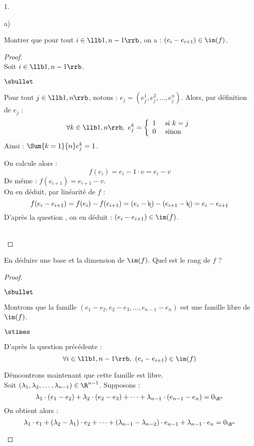 \documentclass[11pt]{article}%
\begin{document}
\begin{noliste}{1.}
\begin{noliste}{a)}
\newpage


\item Montrer que pour tout $i \in \llb 1,n-1 \rrb$, on a :
  $(e_i-e_{i+1})\in \im(f)$.
  
  \begin{proof}~\\
   Soit $i\in \llb 1, n-1 \rrb$.
   \begin{noliste}{$\sbullet$}
   \item Pour tout $j \in \llb 1, n \rrb$, notons : $e_j = (e_j^1,
     e_j^2, \ldots, e_j^n)$. Alors, par définition de $e_j$ :
     \[
     \forall k \in \llb 1, n \rrb, \ e_j^k = \left\{
       \begin{array}{cl}
         1 & \mbox{ si $k=j$}\\
         0 & \mbox{ sinon}
       \end{array}
     \right.
     \]
     Ainsi : $\Sum{k=1}{n} e_j^k = 1$.
     
   \item On calcule alors :
     \[
     f(e_i) = e_i - 1 \cdot v = e_i - v
     \]
     De même : $f(e_{i+1}) = e_{i+1}-v$.\\
     On en déduit, par linéarité de $f$ :
     \[
     f(e_i-e_{i+1}) = f(e_i)-f(e_{i+1}) = (e_i - \bcancel{v}) - (e_{i+1}
     - \bcancel{v}) = e_i - e_{i+1}
     \]
     D'après la question , on en déduit : 
     $(e_i-e_{i+1}) \in \im(f)$.
   \end{noliste}
   ~\\[-1.2cm]
  \end{proof}

  \item En déduire une base et la dimension  de $\im(f)$. Quel est le 
  rang de $f$ ?
  
  \begin{proof}~
    \begin{noliste}{$\sbullet$}
    \item Montrons que la famille $(e_1-e_2, e_2-e_3, \ldots, 
      e_{n-1} - e_n)$ est une famille libre de $\im(f)$.
      \begin{noliste}{$\stimes$}
      \item D'après la question précédente :
        \[
        \forall i \in \llb 1, n-1 \rrb, \ (e_i - e_{i+1}) \in \im(f)
        \]
      
      \item Démoontrons maintenant que cette famille est libre. \\
        Soit $(\lambda_1, \lambda_2, \ldots, \lambda_{n-1}) \in
        \R^{n-1}$. Supposons :
        \[
        \lambda_1 \cdot (e_1 - e_2) + \lambda_2 \cdot (e_2 - e_3)
        + \cdots + \lambda_{n-1} \cdot (e_{n-1}-e_n) = 0_{\R^n}
      \]
      On obtient alors :
      \[
       \lambda_1 \cdot e_1 + (\lambda_2 - \lambda_1) \cdot e_2 + 
       \cdots + (\lambda_{n-1} - \lambda_{n-2}) \cdot e_{n-1} +
       \lambda_{n-1} \cdot e_n = 0_{\R^n}
      \]



\end{noliste}
\end{noliste}
\end{proof}
\end{noliste}
\end{noliste}
\end{document}
